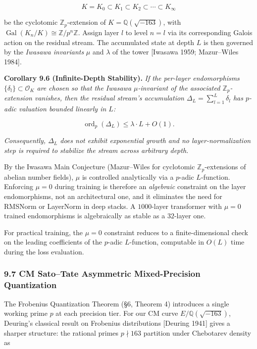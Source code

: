 \documentclass[
  11pt,
]{article}
\begin{document}
\[K = K_0 \subset K_1 \subset K_2 \subset \cdots \subset K_\infty\]

be the cyclotomic \(\mathbb{Z}_p\)-extension of
\(K = \mathbb{Q}(\sqrt{-163})\), with
\(\operatorname{Gal}(K_n/K) \cong \mathbb{Z}/p^n\mathbb{Z}\). Assign
layer \(l\) to level \(n = l\) via its corresponding Galois action on
the residual stream. The accumulated state at depth \(L\) is then
governed by the \emph{Iwasawa invariants} \(\mu\) and \(\lambda\) of the
tower {[}Iwasawa 1959; Mazur--Wiles 1984{]}.

\textbf{Corollary 9.6 (Infinite-Depth Stability).} \emph{If the
per-layer endomorphisms \(\{\delta_l\} \subset \mathcal{O}_K\) are
chosen so that the Iwasawa \(\mu\)-invariant of the associated
\(\mathbb{Z}_p\)-extension vanishes, then the residual stream's
accumulation \(\Delta_L = \sum_{l=1}^L \delta_l\) has \(p\)-adic
valuation bounded linearly in \(L\):}

\[\operatorname{ord}_p(\Delta_L) \leq \lambda \cdot L + O(1).\]

\emph{Consequently, \(\Delta_L\) does not exhibit exponential growth and
no layer-normalization step is required to stabilize the stream across
arbitrary depth.}

By the Iwasawa Main Conjecture (Mazur--Wiles for cyclotomic
\(\mathbb{Z}_p\)-extensions of abelian number fields), \(\mu\) is
controlled analytically via a \(p\)-adic \(L\)-function. Enforcing
\(\mu = 0\) during training is therefore an \emph{algebraic} constraint
on the layer endomorphisms, not an architectural one, and it eliminates
the need for RMSNorm or LayerNorm in deep stacks. A \(1000\)-layer
transformer with \(\mu = 0\) trained endomorphisms is algebraically as
stable as a \(32\)-layer one.

For practical training, the \(\mu = 0\) constraint reduces to a
finite-dimensional check on the leading coefficients of the \(p\)-adic
\(L\)-function, computable in \(O(L)\) time during the loss evaluation.

\hypertarget{cm-satotate-asymmetric-mixed-precision-quantization}{%
\subsubsection{9.7 CM Sato--Tate Asymmetric Mixed-Precision
Quantization}\label{cm-satotate-asymmetric-mixed-precision-quantization}}

The Frobenius Quantization Theorem (§6, Theorem 4) introduces a single
working prime \(p\) at each precision tier. For our CM curve
\(E / \mathbb{Q}(\sqrt{-163})\), Deuring's classical result on Frobenius
distributions {[}Deuring 1941{]} gives a sharper structure: the rational
primes \(p \nmid 163\) partition under Chebotarev density as
\end{document}
